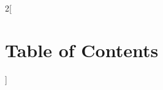\documentclass[
    ngerman
]{article}
\begin{document}
\maketitle
\thispagestyle{fancy}

\begin{multicols*}{2}[
    \section*{Table of Contents}
  ]
  \tableofcontents
\end{multicols*}
\newpage


\newpage

\newpage

\newpage

\newpage

\newpage

\newpage

\newpage

\newpage

\newpage

\newpage

\newpage
\end{document}
